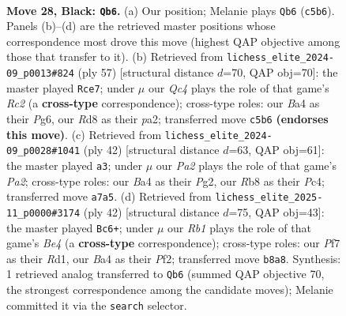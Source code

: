 \documentclass[11pt]{article}
\begin{document}
\clearpage

\begin{figure}[p]\centering
\begin{subfigure}{0.46\textwidth}\centering
\resizebox{\linewidth}{!}{%
\newchessgame
\chessboard[
  setfen={1r1r4/pp3pk1/8/2q4p/b3PQ2/P5Pp/1P3P2/RB2R1K1 b - - 0 28},
  showmover=false,
  pgfstyle=straightmove, color=movearrow, markmove={c5-b6}
]}
\caption{}
\end{subfigure}\hfill
\begin{subfigure}{0.46\textwidth}\centering
\resizebox{\linewidth}{!}{%
\newchessgame
\chessboard[
  setfen={4r1k1/ppr2p1p/6p1/8/Q1P2q2/1P5P/P4PP1/1B3RK1 b - - 6 29},
  showmover=false,
  pgfstyle=straightmove, color=movearrow, markmove={c7-e7}
]}
\caption{}
\end{subfigure}
\\[4pt]
\begin{subfigure}{0.46\textwidth}\centering
\resizebox{\linewidth}{!}{%
\newchessgame
\chessboard[
  setfen={r5k1/p4pp1/2prp2p/2q5/2P1Q3/6P1/PP3PP1/3RR1K1 w - - 1 22},
  showmover=false,
  pgfstyle=straightmove, color=movearrow, markmove={a2-a3}
]}
\caption{}
\end{subfigure}\hfill
\begin{subfigure}{0.46\textwidth}\centering
\resizebox{\linewidth}{!}{%
\newchessgame
\chessboard[
  setfen={1r2k2r/5ppp/Q3pb2/1p2p3/1Pq1B3/P3P3/5PKP/R2R4 w k - 0 22},
  showmover=false,
  pgfstyle=straightmove, color=movearrow, markmove={e4-c6}
]}
\caption{}
\end{subfigure}
\caption{\textbf{Move 28, Black: \texttt{Qb6}.} (a) Our position; Melanie plays \texttt{Qb6} (\texttt{c5b6}). Panels (b)--(d) are the retrieved master positions whose correspondence most drove this move (highest QAP objective among those that transfer to it). (b) Retrieved from \texttt{lichess\_elite\_2024-09\_p0013\#824} (ply 57) [structural distance $d$=70, QAP obj=70]: the master played \texttt{Rce7}; under $\mu$ our \emph{Qc4} plays the role of that game's \emph{Rc2} (a \textbf{cross-type} correspondence); cross-type roles: our \emph{B}a4 as their \emph{P}g6, our \emph{R}d8 as their \emph{p}a2; transferred move \texttt{c5b6} \textbf{(endorses this move)}. (c) Retrieved from \texttt{lichess\_elite\_2024-09\_p0028\#1041} (ply 42) [structural distance $d$=63, QAP obj=61]: the master played \texttt{a3}; under $\mu$ our \emph{Pa2} plays the role of that game's \emph{Pa2}; cross-type roles: our \emph{B}a4 as their \emph{P}g2, our \emph{R}b8 as their \emph{P}c4; transferred move \texttt{a7a5}. (d) Retrieved from \texttt{lichess\_elite\_2025-11\_p0000\#3174} (ply 42) [structural distance $d$=75, QAP obj=43]: the master played \texttt{Bc6+}; under $\mu$ our \emph{Rb1} plays the role of that game's \emph{Be4} (a \textbf{cross-type} correspondence); cross-type roles: our \emph{P}f7 as their \emph{R}d1, our \emph{B}a4 as their \emph{P}f2; transferred move \texttt{b8a8}. Synthesis: 1 retrieved analog transferred to \texttt{Qb6} (summed QAP objective 70, the strongest correspondence among the candidate moves); Melanie committed it via the \texttt{search} selector.}
\label{fig:thought-m55}
\end{figure}
\end{document}
